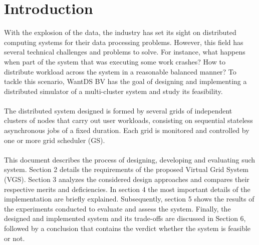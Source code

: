 \section{Introduction}
With the explosion of the data, the industry has set its sight on distributed computing systems for their data processing problems. However, this field has several technical challenges and problems to solve. For instance, what happens when part of the system that was executing some work crashes? How to distribute workload across the system in a reasonable balanced manner? To tackle this scenario, WantDS BV has the goal of designing and implementing a distributed simulator of a multi-cluster system and study its feasibility. 
\\\\
The distributed system designed is formed by several grids of independent clusters of nodes that carry out user workloads, consisting on sequential stateless asynchronous jobs of a fixed duration. Each grid is monitored and controlled by one or more grid scheduler (GS).
\\\\
This document describes the process of designing, developing and evaluating such system. Section 2 details the requirements of the proposed Virtual Grid System (VGS). Section 3 analyzes the considered design approaches and compares their respective merits and deficiencies. In section 4 the most important details of the implementation are briefly explained. Subsequently, section 5 shows the results of the experiments conducted to evaluate and assess the system. Finally, the designed and implemented system and its trade-offs are discussed in Section 6, followed by a conclusion that contains the verdict whether the system is feasible or not.
